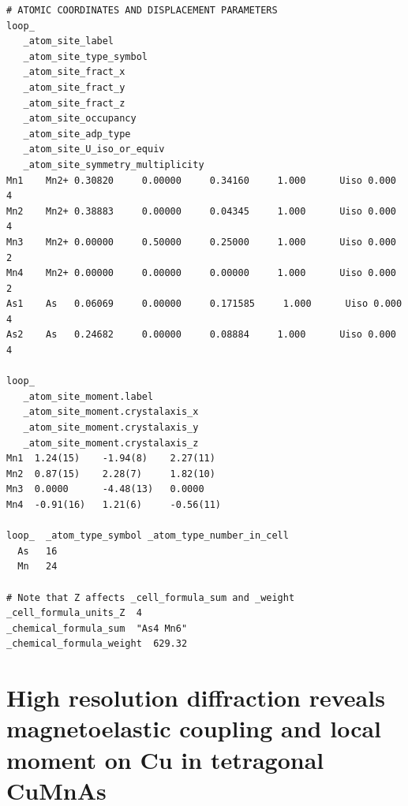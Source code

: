 \documentclass[10pt,doublespacing,edeposit]{uiucthesis2020}
\begin{document}
\begin{mainmatter}
\begin{verbatim}
# ATOMIC COORDINATES AND DISPLACEMENT PARAMETERS
loop_ 
   _atom_site_label
   _atom_site_type_symbol
   _atom_site_fract_x
   _atom_site_fract_y
   _atom_site_fract_z
   _atom_site_occupancy
   _atom_site_adp_type
   _atom_site_U_iso_or_equiv
   _atom_site_symmetry_multiplicity
Mn1    Mn2+ 0.30820     0.00000     0.34160     1.000      Uiso 0.000      4   
Mn2    Mn2+ 0.38883     0.00000     0.04345     1.000      Uiso 0.000      4   
Mn3    Mn2+ 0.00000     0.50000     0.25000     1.000      Uiso 0.000      2   
Mn4    Mn2+ 0.00000     0.00000     0.00000     1.000      Uiso 0.000      2   
As1    As   0.06069     0.00000     0.171585     1.000      Uiso 0.000      4   
As2    As   0.24682     0.00000     0.08884     1.000      Uiso 0.000      4   

loop_
   _atom_site_moment.label
   _atom_site_moment.crystalaxis_x
   _atom_site_moment.crystalaxis_y
   _atom_site_moment.crystalaxis_z
Mn1  1.24(15)    -1.94(8)    2.27(11)    
Mn2  0.87(15)    2.28(7)     1.82(10)    
Mn3  0.0000      -4.48(13)   0.0000      
Mn4  -0.91(16)   1.21(6)     -0.56(11)   

loop_  _atom_type_symbol _atom_type_number_in_cell
  As   16
  Mn   24

# Note that Z affects _cell_formula_sum and _weight
_cell_formula_units_Z  4
_chemical_formula_sum  "As4 Mn6"
_chemical_formula_weight  629.32
\end{verbatim}

\chapter{High resolution diffraction reveals magnetoelastic coupling and local moment on Cu in tetragonal CuMnAs}


\end{mainmatter}
\end{document}
